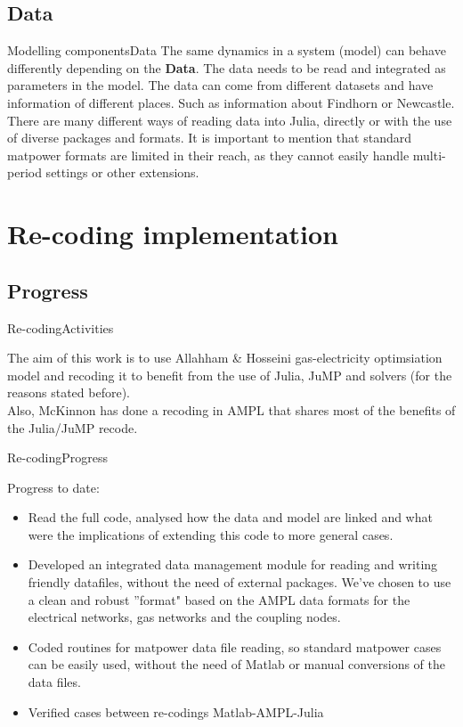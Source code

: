 \documentclass[handout]{beamer}
\begin{document}
\subsection{Data}
\begin{frame}[t]{Modelling components}{Data}
  The same dynamics in a system (model) can behave differently depending on the \textbf{Data}. The data needs to be read and integrated as parameters in the model. The data can come from different datasets and have information of different places. Such as information about Findhorn or Newcastle.\\[6pt]

  There are many different ways of reading data into Julia, directly or with the use of diverse packages and formats. It is important to mention that standard matpower formats are limited in their reach, as they cannot easily handle multi-period settings or other extensions.

\end{frame}


\section{Re-coding implementation}

\subsection{Progress}
\begin{frame}[t]{Re-coding}{Activities}

The aim of this work is to use Allahham \& Hosseini gas-electricity optimsiation model and recoding it to benefit from the use of Julia, JuMP and solvers (for the reasons stated before). \\[12pt]

Also, McKinnon has done a recoding in AMPL that shares most of the benefits of the Julia/JuMP recode.

\end{frame}

\begin{frame}[t]{Re-coding}{Progress}

Progress to date:
\begin{itemize}
  \item Read the full code, analysed how the data and model are linked and what were the implications of extending this code to more general cases.
  \item Developed an integrated data management module for reading and writing friendly datafiles, without the need of external packages. We've chosen to use a clean and robust ''format" based on the AMPL data formats for the electrical networks, gas networks and the coupling nodes.
  \item Coded routines for matpower data file reading, so standard matpower cases can be easily used, without the need of Matlab or manual conversions of the data files.
  \item Verified cases between re-codings Matlab-AMPL-Julia
\end{itemize}

\end{frame}
\end{document}
